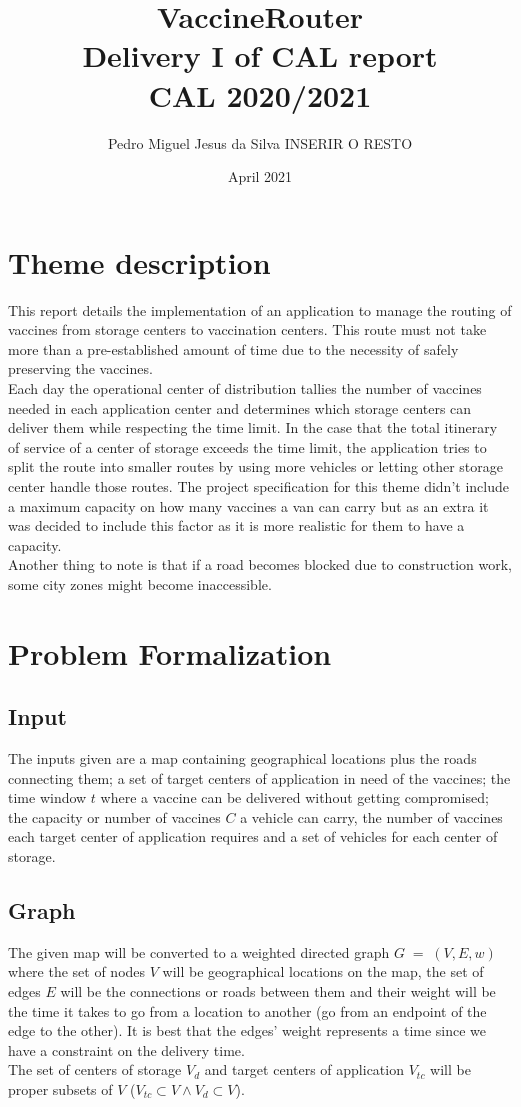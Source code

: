 \documentclass{article}
\title{ 
    \huge VaccineRouter
    \vspace*{4pt} \\ \large Delivery I of CAL report
    \vspace*{4pt} \\ \large CAL 2020/2021
    }
\author{Pedro Miguel Jesus da Silva INSERIR O RESTO }
\date{April 2021}
\begin{document}
\maketitle
\newpage
\tableofcontents
\newpage

\section{Theme description}
This report details the implementation of an application to manage the routing of vaccines from storage centers to vaccination centers. This route must not take more than a pre-established amount of time due to the necessity of safely preserving the vaccines. \\
Each day the operational center of distribution tallies the number of vaccines needed in each application center and determines which storage centers can deliver them while respecting the time limit. In the case that the total itinerary of service of a center of storage exceeds the time limit, the application tries to split the route into smaller routes by using more vehicles or letting other storage center handle those routes. The project specification for this theme didn't include a maximum capacity on how many vaccines a van can carry but as an extra it was decided to include this factor as it is more realistic for them to have a capacity.\\Another thing to note is that if a road becomes blocked due to construction work, some city zones might become inaccessible.  

\section{Problem Formalization}
\subsection{Input}
The inputs given are a map containing geographical locations plus the roads connecting them; a set of target centers of application in need of the vaccines; the time window $t$ where a vaccine can be delivered without getting compromised; the capacity or number of vaccines $C$ a vehicle can carry, the number of vaccines each target center of application requires and a set of vehicles for each center of storage. 
\subsection{Graph}
The given map will be converted to a weighted directed graph $G\;=\;(V,E,w)$ where the set of nodes $V$ will be geographical locations on the map, the set of edges $E$ will be the connections or roads between them and their weight will be the time it takes to go from a location to another (go from an endpoint of the edge to the other). It is best that the edges' weight represents a time since we have a constraint on the delivery time.\\ The set of centers of storage $V_d$ and target centers of application $V_{tc}$ will be proper subsets of $V$ ($V_{tc} \subset V \wedge V_{d}\subset V$).
\end{document}
